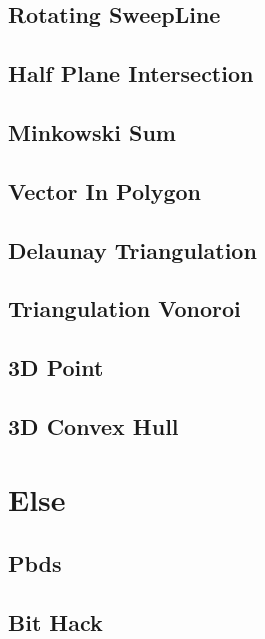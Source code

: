 \subsection{Rotating SweepLine}

\subsection{Half Plane Intersection}
\subsection{Minkowski Sum}
\subsection{Vector In Polygon}
\subsection{Delaunay Triangulation}
\subsection{Triangulation Vonoroi}
\subsection{3D Point}

\subsection{3D Convex Hull}


\section{Else}
\subsection{Pbds}

\subsection{Bit Hack}


